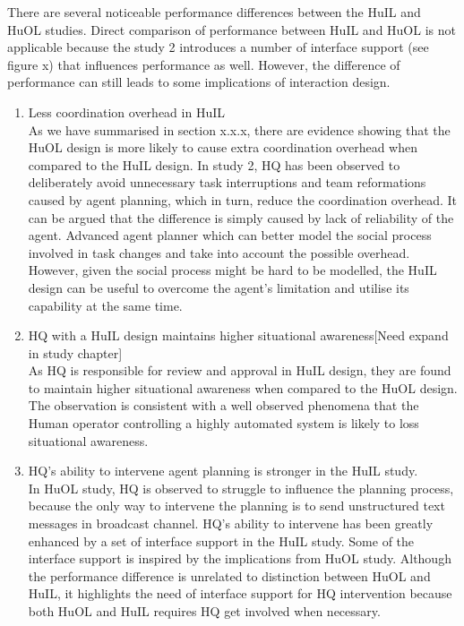 

There are several noticeable performance differences between the HuIL and HuOL studies. Direct comparison of performance between HuIL and HuOL is not applicable because the study 2 introduces a number of interface support (see figure x) that influences performance as well. However, the difference of performance can still leads to some implications of interaction design.\\

\begin{enumerate}
\item Less coordination overhead in HuIL \\
As we have summarised in section x.x.x, there are evidence showing that the HuOL design is more likely to cause extra coordination overhead when compared to the HuIL design. In study 2, HQ has been observed to deliberately avoid unnecessary task interruptions and team reformations caused by agent planning, which in turn, reduce the coordination overhead. It can be argued that the difference is simply caused by lack of reliability of the agent. Advanced agent planner which can better model the social process involved in task changes and take into account the possible overhead. However, given the social process might be hard to be modelled, the HuIL design can be useful to overcome the agent's limitation and utilise its capability at the same time.\\


\item HQ with a HuIL design maintains higher situational awareness[Need expand in study chapter]\\
As HQ is responsible for review and approval in HuIL design, they are found to maintain higher situational awareness when compared to the HuOL design. The observation is consistent with a well observed phenomena that the Human operator controlling a highly automated system is likely to loss situational awareness.\\


\item HQ's ability to intervene agent planning is stronger in the HuIL study.\\
In HuOL study, HQ is observed to struggle to influence the planning process, because the only way to intervene the planning is to send unstructured text messages in broadcast channel. HQ's ability to intervene has been greatly enhanced by a set of interface support in the HuIL study. Some of the interface support is inspired by the implications from HuOL study. Although the performance difference is unrelated to distinction between HuOL and HuIL, it highlights the need of interface support for HQ intervention because both HuOL and HuIL requires HQ get involved when necessary. \\

\end{enumerate}

